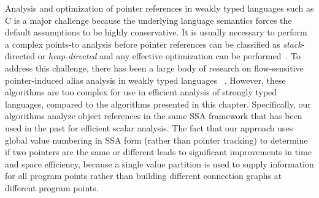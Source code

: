 Analysis and optimization of pointer references
in weakly typed languages such as C is a
major challenge because the underlying language semantics forces the
default assumptions to be highly conservative.  It is usually
necessary to perform a complex points-to analysis before pointer
references can be classified as {\it stack}-directed or {\it
heap-directed} and any effective optimization can be
performed~\cite{ghiya-hendren-98}.
To address this challenge,
there has been a large body of research on flow-sensitive
pointer-induced alias analysis in weakly typed languages \eg\
\cite{LaHi88,ChWZ90,HendrenHN1992,LandiRZ1993,ChBC93}.  
However,  these algorithms are too complex for use in efficient 
analysis of strongly typed languages, compared to the algorithms
presented in this chapter.
Specifically, our algorithms
analyze object references in the same SSA framework that has been
used in the past for efficient scalar analysis.  The fact that our
approach uses global value numbering in SSA form (rather than pointer
tracking) to determine if two pointers are the same or different leads
to significant improvements in time and space efficiency, because a
single value partition is used to supply information for all program
points rather than building different connection graphs at different
program points.
